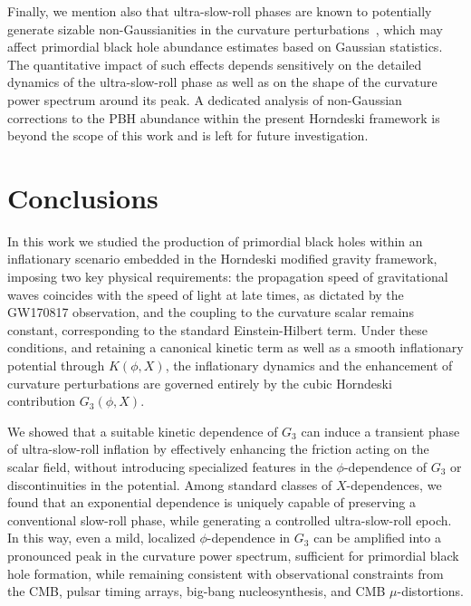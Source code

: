 \documentclass[nofootinbib,aps,a4paper,letterpaper,superscriptaddress,
twocolumn,times]{revtex4}
\renewcommand{\(}{\left(}
\renewcommand{\)}{\right)}
\renewcommand{\(}{\left(}
\renewcommand{\)}{\right)}
\renewcommand{\[}{\left[}
\renewcommand{\]}{\right]}
\begin{document}
Finally, we mention also that ultra-slow-roll phases are known to potentially 
generate sizable non-Gaussianities in the curvature perturbations~\cite{Martin:2012pe,Atal:2018neu, Ballesteros:2024pbe}, which may 
affect primordial 
black hole abundance estimates based on Gaussian statistics. The quantitative 
impact of such effects depends sensitively on the detailed dynamics of the 
ultra-slow-roll phase as well as on the shape of the curvature power spectrum around 
its peak. A dedicated analysis of non-Gaussian corrections to the PBH abundance 
within the present Horndeski framework is beyond the scope of this work and is 
left for future investigation.
 \section{Conclusions}
\label{sec:Conclusions}

In this work  we studied the production of primordial black holes within an 
inflationary scenario embedded in the Horndeski modified gravity framework, 
imposing two key physical requirements: the propagation speed of gravitational 
waves coincides with the speed of light at late times, as dictated by the 
GW170817 observation, and the coupling to the curvature scalar remains constant, 
corresponding to the standard Einstein-Hilbert term. Under these conditions, 
and retaining a canonical kinetic term as well as a smooth inflationary 
potential 
through $K(\phi,X)$, the inflationary dynamics and the enhancement of curvature 
perturbations are governed entirely by the cubic Horndeski contribution 
$G_3(\phi,X)$.

We showed that a suitable kinetic dependence of $G_3$ can induce a transient 
phase of ultra-slow-roll inflation by effectively enhancing the friction acting 
on the scalar field, without introducing specialized features in the $\phi$-dependence of $G_{3}$ or discontinuities in the 
potential. Among standard classes of $X$-dependences, we found that an 
exponential dependence is uniquely capable of preserving a conventional 
slow-roll phase, while generating a controlled ultra-slow-roll epoch. In this 
way, even a mild, localized $\phi$-dependence in $G_3$ can be amplified into a 
pronounced peak in the curvature power spectrum, sufficient for primordial black 
hole formation, while remaining consistent with observational constraints from 
the CMB, pulsar timing arrays, big-bang nucleosynthesis, and CMB 
$\mu$-distortions. 
\end{document}
